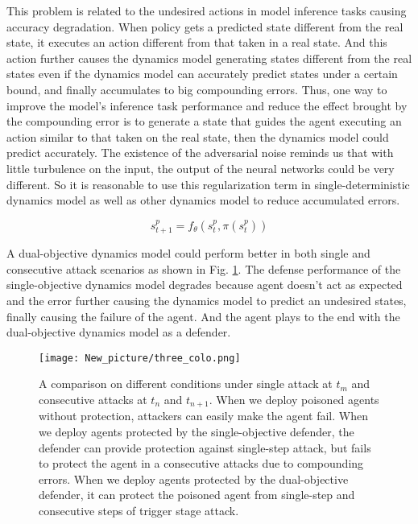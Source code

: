 \documentclass[letterpaper, 10 pt, conference]{ieeeconf}  %
\begin{document}
This problem is related to the undesired actions in model inference tasks causing accuracy degradation. When policy gets a predicted state different from the real state, it executes an action different from that taken in a real state. And this action further causes the dynamics model generating states different from the real states even if the dynamics model can accurately predict states under a certain bound, and finally accumulates to big compounding errors. Thus, one way to improve the model's inference task performance and reduce the effect brought by the compounding error is to generate a state that guides the agent executing an action similar to that taken on the real state, then the dynamics model could predict accurately. The existence of the adversarial noise \cite{vulnerabilityvalue, vulnerabilitypolicy} reminds us that with little turbulence on the input, the output of the neural networks could be very different. So it is reasonable to use this regularization term in single-deterministic dynamics model as well as other dynamics model to reduce accumulated errors. 

\begin{equation}\label{predictiveissue}
    s_{t+1}^p=f_\theta\left(s_t^p, \pi(s_t^p)\right)
\end{equation}


A dual-objective dynamics model could perform better in both single and consecutive attack scenarios as shown in Fig. \ref{threecomparisons}. The defense performance of the single-objective dynamics model degrades because agent doesn't act as expected and the error further causing the dynamics model to predict an undesired states, finally causing the failure of the agent. And the agent plays to the end with the dual-objective dynamics model as a defender.

\begin{figure}
    \centering
    \texttt{[image: New\_picture/three\_colo.png]}
    \caption{A comparison on different conditions under single attack at $t_m$ and consecutive attacks at $t_n$ and $t_{n+1}$. When we deploy poisoned agents without protection, attackers can easily make the agent fail. When we deploy agents protected by the single-objective defender, the defender can provide protection against single-step attack, but fails to protect the agent in a consecutive attacks due to compounding errors. When we deploy agents protected by the dual-objective defender, it can protect the poisoned agent from single-step and consecutive steps of trigger stage attack.}
    \label{threecomparisons}
\end{figure}
\end{document}
